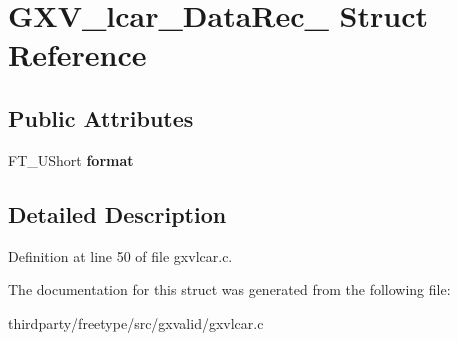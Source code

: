 \hypertarget{struct_g_x_v__lcar___data_rec__}{}\section{G\+X\+V\+\_\+lcar\+\_\+\+Data\+Rec\+\_\+ Struct Reference}
\label{struct_g_x_v__lcar___data_rec__}
\subsection*{Public Attributes}
\begin{DoxyCompactItemize}
\item 
\mbox{\label{struct_g_x_v__lcar___data_rec___a3346c0aaf55d0f754c28c8acc013841b}} 
F\+T\+\_\+\+U\+Short {\bfseries format}
\end{DoxyCompactItemize}


\subsection{Detailed Description}


Definition at line 50 of file gxvlcar.\+c.



The documentation for this struct was generated from the following file\+:\begin{DoxyCompactItemize}
\item 
thirdparty/freetype/src/gxvalid/gxvlcar.\+c\end{DoxyCompactItemize}
